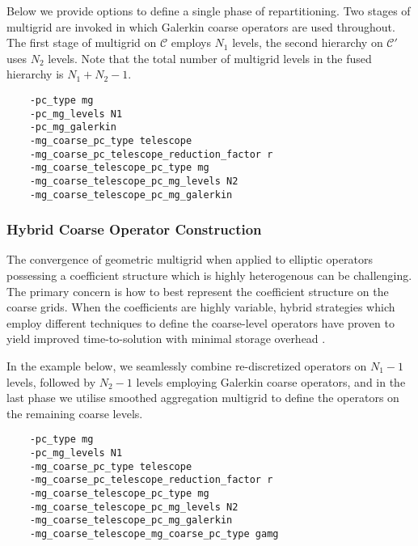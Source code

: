 \documentclass[]{siamart0216}
\begin{document}
	Below we provide options to define a single phase of repartitioning. Two stages of multigrid are invoked 
	in which Galerkin coarse operators are used throughout. The first stage of multigrid on $\mathcal C$ 
	employs $N_1$ levels, the second hierarchy on $\mathcal C'$ uses $N_2$ levels. 
	Note that the total number of multigrid levels in the fused hierarchy is $N_1 + N_2 - 1$.
\begin{tcolorbox}[colframe=red,colback=cornsilk,boxrule=0.5pt,arc=4pt,
      left=-6pt,right=6pt,top=6pt,bottom=6pt,boxsep=0pt]
	\begin{verbatim}
    -pc_type mg
    -pc_mg_levels N1
    -pc_mg_galerkin
    -mg_coarse_pc_type telescope
    -mg_coarse_pc_telescope_reduction_factor r
    -mg_coarse_telescope_pc_type mg
    -mg_coarse_telescope_pc_mg_levels N2
    -mg_coarse_telescope_pc_mg_galerkin
	\end{verbatim}
\end{tcolorbox}
\subsubsection{Hybrid Coarse Operator Construction}
The convergence of geometric multigrid when applied to elliptic operators possessing a 
	coefficient structure which is highly heterogenous can be challenging. 
	The primary concern is how to best represent the coefficient structure on the coarse grids. 
	When the coefficients are highly variable, hybrid strategies which employ different techniques 
	to define the coarse-level operators have proven to yield improved time-to-solution with 
	minimal storage overhead \cite{may2015scalable,sundar2012parallel}.

	In the example below, we seamlessly combine re-discretized operators on $N_1-1$ levels, followed by $N_2-1$ levels 
	employing Galerkin coarse operators, and in the last phase we utilise smoothed aggregation multigrid 
	to define the operators on the remaining coarse levels.
\begin{tcolorbox}[colframe=red,colback=cornsilk,boxrule=0.5pt,arc=4pt,
      left=-6pt,right=6pt,top=6pt,bottom=6pt,boxsep=0pt]
	\begin{verbatim}
    -pc_type mg
    -pc_mg_levels N1
    -mg_coarse_pc_type telescope
    -mg_coarse_pc_telescope_reduction_factor r
    -mg_coarse_telescope_pc_type mg
    -mg_coarse_telescope_pc_mg_levels N2
    -mg_coarse_telescope_pc_mg_galerkin
    -mg_coarse_telescope_mg_coarse_pc_type gamg
	\end{verbatim}
\end{tcolorbox}
\end{document}
